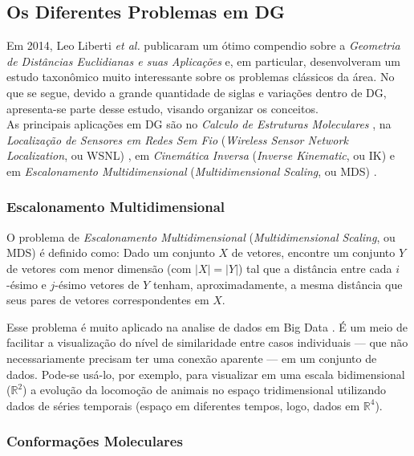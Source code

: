 \subsection{Os Diferentes Problemas em DG}

Em 2014, Leo Liberti \textit{et al.} publicaram um ótimo compendio sobre a \textit{Geometria de Distâncias Euclidianas e suas Aplicações} e, em particular, desenvolveram um estudo  taxonômico muito interessante sobre os problemas clássicos da área. No que se segue, devido a grande quantidade de siglas e variações dentro de DG, apresenta-se parte desse estudo, visando organizar os conceitos. 
\\

As principais aplicações em DG são no \textit{Calculo de Estruturas Moleculares} \cite{crippen:DistancesAndMolecularConformation}, na \textit{Localização de Sensores em Redes Sem Fio} (\textit{Wireless Sensor Network Localization}, ou WSNL) \cite{yemini1978positioning}, em \textit{Cinemática Inversa} (\textit{Inverse Kinematic}, ou IK) \cite{cinematicaInversa} e em \textit{Escalonamento Multidimensional} (\textit{Multidimensional Scaling}, ou MDS) \cite{multidimensionalScaling}.

\subsubsection{Escalonamento Multidimensional}

O problema de \textit{Escalonamento Multidimensional} (\textit{Multidimensional Scaling}, ou MDS)
é definido como: Dado um conjunto $X$ de vetores, encontre um conjunto $Y$ de vetores com menor dimensão (com $|X| = |Y|$) tal que a distância entre cada $i$-ésimo e $j$-ésimo vetores de $Y$ tenham, aproximadamente, a mesma distância que seus pares de vetores correspondentes em $X$.

Esse problema é muito aplicado na analise de dados em Big Data \cite{libertiEDG}. É um meio de facilitar a visualização do nível de similaridade entre casos individuais --- que não necessariamente precisam ter uma conexão aparente --- em um conjunto de dados. Pode-se usá-lo, por exemplo, para visualizar em uma escala bidimensional ($\mathbb{R}^2$) a evolução da locomoção de animais no espaço tridimensional utilizando dados de séries temporais (espaço em diferentes tempos, logo, dados em $\mathbb{R}^4$).

\subsubsection{Conformações Moleculares}

